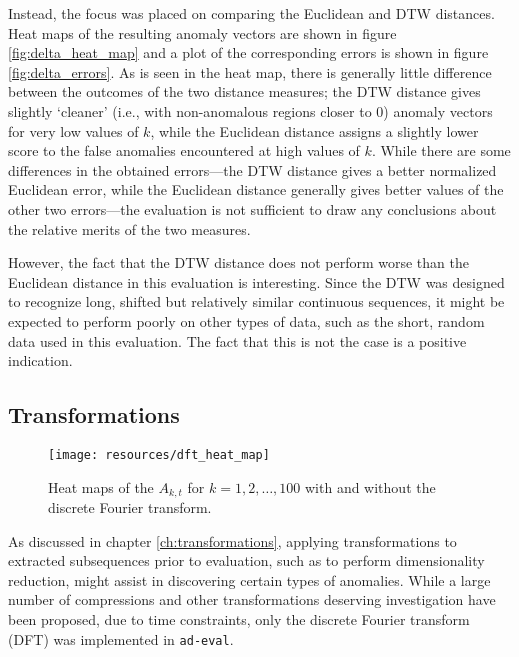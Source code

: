 Instead, the focus was placed on comparing the Euclidean and DTW distances. Heat maps of the resulting anomaly vectors are shown in figure \ref{fig:delta_heat_map} and a plot of the corresponding errors is shown in figure \ref{fig:delta_errors}. As is seen in the heat map, there is generally little difference between the outcomes of the two distance measures; the DTW distance gives slightly `cleaner' (i.e., with non-anomalous regions closer to $0$) anomaly vectors for very low values of $k$, while the Euclidean distance assigns a slightly lower score to the false anomalies encountered at high values of $k$. While there are some differences in the obtained errors---the DTW distance gives a better normalized Euclidean error, while the Euclidean distance generally gives better values of the other two errors---the evaluation is not sufficient to draw any conclusions about the relative merits of the two measures.

However, the fact that the DTW distance does not perform worse than the Euclidean distance in this evaluation is interesting. Since the DTW was designed to recognize long, shifted but relatively similar continuous sequences, it might be expected to perform poorly on other types of data, such as the short, random data used in this evaluation. The fact that this is not the case is a positive indication.

\clearpage

\subsection{Transformations}
\FloatBarrier

\begin{figure}[h]
    \vspace{-10pt}
    \begin{center}
        \texttt{[image: resources/dft\_heat\_map]}
    \end{center}
    \vspace{-20pt}
    \caption{\small{Heat maps of the $A_{k, t} $ for $k = 1,2,\dots,100$ with and without the discrete Fourier transform.}}
    \vspace{-10pt}
    \label{fig:dft_heat_map}
\end{figure}

As discussed in chapter \ref{ch:transformations}, applying transformations to extracted subsequences prior to evaluation, such as to perform dimensionality reduction, might assist in discovering certain types of anomalies. While a large number of compressions and other transformations deserving investigation have been proposed, due to time constraints, only the discrete Fourier transform (DFT) was implemented in \texttt{ad-eval}.

